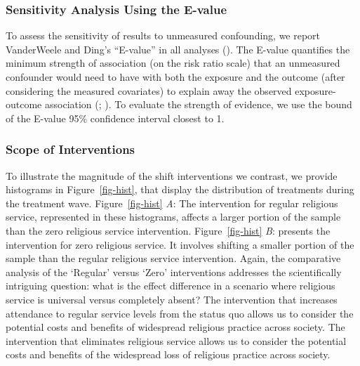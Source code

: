 \documentclass[
  single column]{article}
\begin{document}
\subsubsection{Sensitivity Analysis Using the
E-value}\label{sensitivity-analysis-using-the-e-value}

To assess the sensitivity of results to unmeasured confounding, we
report VanderWeele and Ding's ``E-value'' in all analyses
(). The E-value
quantifies the minimum strength of association (on the risk ratio scale)
that an unmeasured confounder would need to have with both the exposure
and the outcome (after considering the measured covariates) to explain
away the observed exposure-outcome association
(;
). To
evaluate the strength of evidence, we use the bound of the E-value 95\%
confidence interval closest to 1.

\subsubsection{Scope of Interventions}\label{scope-of-interventions}

To illustrate the magnitude of the shift interventions we contrast, we
provide histograms in Figure~\ref{fig-hist}, that display the
distribution of treatments during the treatment wave.
Figure~\ref{fig-hist} \emph{A}: The intervention for regular religious
service, represented in these histograms, affects a larger portion of
the sample than the zero religious service intervention.
Figure~\ref{fig-hist} \emph{B}: presents the intervention for zero
religious service. It involves shifting a smaller portion of the sample
than the regular religious service intervention. Again, the comparative
analysis of the `Regular' versus `Zero' interventions addresses the
scientifically intriguing question: what is the effect difference in a
scenario where religious service is universal versus completely absent?
The intervention that increases attendance to regular service levels
from the status quo allows us to consider the potential costs and
benefits of widespread religious practice across society. The
intervention that eliminates religious service allows us to consider the
potential costs and benefits of the widespread loss of religious
practice across society.
\end{document}
